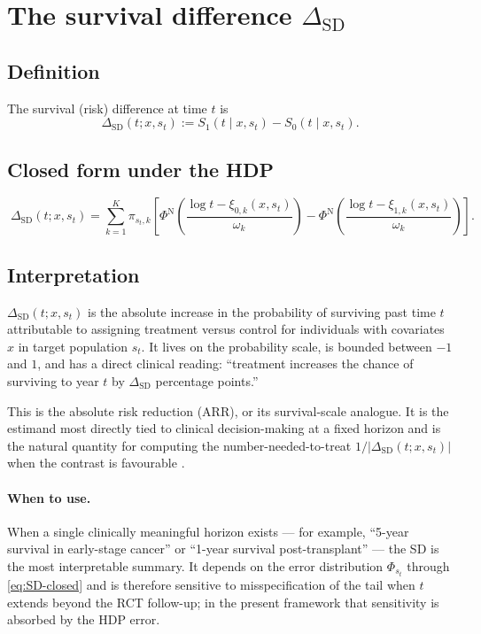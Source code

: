 \documentclass[11pt]{article}
\theoremstyle{plain}
\theoremstyle{definition}
\theoremstyle{remark}
\newcommand{\1}{\mathds{1}}
\newcommand{\Spot}{S}
\newcommand{\SD}{\mathrm{SD}}
\begin{document}
\section{The survival difference $\Delta_{\SD}$}

\subsection{Definition}

The survival (risk) difference at time $t$ is
\begin{equation}
  \Delta_{\SD}(t; x, s_{t})
  := \Spot_{1}(t \mid x, s_{t}) - \Spot_{0}(t \mid x, s_{t}).
\end{equation}

\subsection{Closed form under the HDP}

\begin{equation}
  \boxed{\;
    \Delta_{\SD}(t; x, s_{t})
    = \sum_{k=1}^{K} \pi_{s_{t}, k}\!\left[
        \Phi^{\mathrm{N}}\!\left(\frac{\log t - \xi_{0, k}(x, s_{t})}{\omega_{k}}\right)
      - \Phi^{\mathrm{N}}\!\left(\frac{\log t - \xi_{1, k}(x, s_{t})}{\omega_{k}}\right)
    \right].
  \;}
  \label{eq:SD-closed}
\end{equation}

\subsection{Interpretation}

$\Delta_{\SD}(t; x, s_{t})$ is the absolute increase in the probability of
surviving past time $t$ attributable to assigning treatment versus control
for individuals with covariates $x$ in target population $s_{t}$. It lives
on the probability scale, is bounded between $-1$ and $1$, and has a direct
clinical reading: ``treatment increases the chance of surviving to year $t$
by $\Delta_{\SD}$ percentage points.''

This is the absolute risk reduction (ARR), or its survival-scale analogue.
It is the estimand most directly tied to clinical decision-making at a fixed
horizon and is the natural quantity for computing the number-needed-to-treat
$1/|\Delta_{\SD}(t; x, s_{t})|$ when the contrast is favourable
\citep{Cook1995}.

\paragraph{When to use.} When a single clinically meaningful horizon
exists --- for example, ``5-year survival in early-stage cancer'' or
``1-year survival post-transplant'' --- the SD is the most interpretable
summary. It depends on the error distribution $\Phi_{s_{t}}$ through
\eqref{eq:SD-closed} and is therefore sensitive to misspecification of the
tail when $t$ extends beyond the RCT follow-up; in the present framework
that sensitivity is absorbed by the HDP error.
\end{document}
